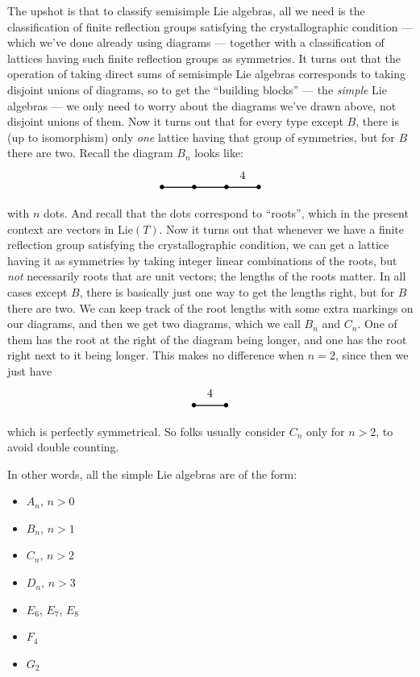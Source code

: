 \documentclass{article}
\def\tightlist{}
\begin{document}
The upshot is that to classify semisimple Lie algebras, all we need is
the classification of finite reflection groups satisfying the
crystallographic condition --- which we've done already using diagrams
--- together with a classification of lattices having such finite
reflection groups as symmetries. It turns out that the operation of
taking direct sums of semisimple Lie algebras corresponds to taking
disjoint unions of diagrams, so to get the ``building blocks'' --- the
\emph{simple} Lie algebras --- we only need to worry about the diagrams
we've drawn above, not disjoint unions of them. Now it turns out that
for every type except \(B\), there is (up to isomorphism) only
\emph{one} lattice having that group of symmetries, but for \(B\) there
are two. Recall the diagram \(B_n\) looks like: \[
  \begin{tikzpicture}
    \draw[thick] (0,0) node{$\bullet$} to (1,0) node{$\bullet$} to (2,0) node{$\bullet$} to node[label=above:{4}]{} (3,0) node {$\bullet$};
  \end{tikzpicture}
\] with \(n\) dots. And recall that the dots correspond to ``roots'',
which in the present context are vectors in \(\mathrm{Lie}(T)\). Now it
turns out that whenever we have a finite reflection group satisfying the
crystallographic condition, we can get a lattice having it as symmetries
by taking integer linear combinations of the roots, but \emph{not}
necessarily roots that are unit vectors; the lengths of the roots
matter. In all cases except \(B\), there is basically just one way to
get the lengths right, but for \(B\) there are two. We can keep track of
the root lengths with some extra markings on our diagrams, and then we
get two diagrams, which we call \(B_n\) and \(C_n\). One of them has the
root at the right of the diagram being longer, and one has the root
right next to it being longer. This makes no difference when \(n = 2\),
since then we just have \[
  \begin{tikzpicture}
    \draw[thick] (0,0) node{$\bullet$} to node[label=above:{4}]{} (1,0) node {$\bullet$};
  \end{tikzpicture}
\] which is perfectly symmetrical. So folks usually consider \(C_n\)
only for \(n > 2\), to avoid double counting.

In other words, all the simple Lie algebras are of the form:

\begin{itemize}
\tightlist
\item
  \(A_n\), \(n > 0\)
\item
  \(B_n\), \(n > 1\)
\item
  \(C_n\), \(n > 2\)
\item
  \(D_n\), \(n > 3\)
\item
  \(E_6\), \(E_7\), \(E_8\)
\item
  \(F_4\)
\item
  \(G_2\)
\end{itemize}
\end{document}
